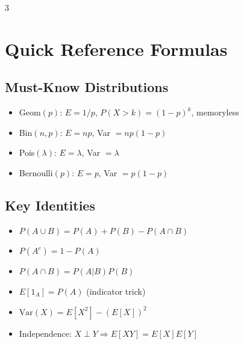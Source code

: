 \documentclass[10pt,landscape]{article}
\begin{document}
\begin{multicols}{3}
\section{Quick Reference Formulas}

\subsection{Must-Know Distributions}
\begin{itemize}[leftmargin=*,noitemsep,topsep=0pt]
\item Geom$(p)$: $E = 1/p$, $P(X>k) = (1-p)^k$, memoryless
\item Bin$(n,p)$: $E = np$, Var $= np(1-p)$
\item Pois$(\lambda)$: $E = \lambda$, Var $= \lambda$
\item Bernoulli$(p)$: $E = p$, Var $= p(1-p)$
\end{itemize}

\subsection{Key Identities}
\begin{itemize}[leftmargin=*,noitemsep,topsep=0pt]
\item $P(A \cup B) = P(A) + P(B) - P(A \cap B)$
\item $P(A^c) = 1 - P(A)$
\item $P(A \cap B) = P(A|B)P(B)$
\item $E[1_A] = P(A)$ (indicator trick)
\item $\text{Var}(X) = E[X^2] - (E[X])^2$
\item Independence: $X \perp Y \Rightarrow E[XY] = E[X]E[Y]$
\end{itemize}

\end{multicols}
\end{document}
